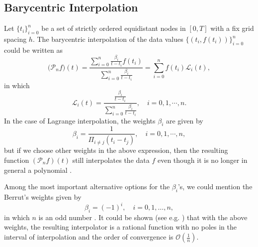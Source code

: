 \documentclass[fleqn,final,3p,11pt]{elsarticle}
\theoremstyle{definition}
\theoremstyle{remark}
\numberwithin{equation}{section}
\begin{document}
\subsection{Barycentric Interpolation}\label{baryin}
Let $\{t_{i}\}_{i=0}^{n}$ be a set of strictly ordered equidistant nodes in $[0, T]$ with a fix grid spacing $h$. The barycentric interpolation of the data values $ \{(t_{i}, f(t_{i}))\}_{i=0}^{n} $ could be written as
\begin{equation}\label{barycent}
\mathcal ({\mathcal{P}}_{n}f)(t)=\frac{\sum_{i=0}^{n}\frac{\beta_{i}}{t-t_{i}}f(t_{i})}{\sum_{i=0}^{n}\frac{\beta_{i}}{t-t_{i}}}
= \sum_{i=0}^{n}f(t_{i})\mathcal{L}_{i}(t),
\end{equation}
in which \begin{equation}\label{li}
\mathcal{L}_{i}(t) =\frac{\frac{\beta_{i}}{t-t_{i}}}{\sum_{i=0}^{n}\frac{\beta_{i}}{t-t_{i}}},\quad i=0,1,\cdots, n.\end{equation}
In the case of Lagrange interpolation, the weights $ \beta_{i} $ are given by
\begin{equation}\label{weibary}
\beta_{i}=\frac{1}{\Pi_{i\neq j}(t_{i} - t_{j})}, \quad i=0,1, \cdots, n, \end{equation}
but if we choose other weights in the above expression, then the resulting function $({\mathcal{P}}_{n}f)(t)$ still interpolates the data $f$ even though it is no longer in general a polynomial \cite{bary}.

Among the most important alternative options for the $\beta_{i}$'s, we could mention the Berrut's weights given by
\begin{equation}\label{ber}
\beta_{i}=(-1)^{i}, \quad i=0,1, \ldots, n,
\end{equation}
in which $n$ is an odd number \cite{kai112}. It could be shown (see e.g. \cite{bary}) that with the above weights, the resulting interpolator is a rational function with no poles in the interval of interpolation and the order of convergence is $\mathcal{O}(\frac{1}{n})$.
\end{document}
